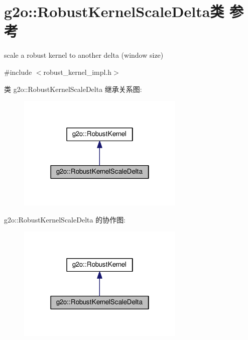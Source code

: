 \hypertarget{classg2o_1_1RobustKernelScaleDelta}{\section{g2o\-:\-:Robust\-Kernel\-Scale\-Delta类 参考}
\label{classg2o_1_1RobustKernelScaleDelta}
}


scale a robust kernel to another delta (window size)  




{\ttfamily \#include $<$robust\-\_\-kernel\-\_\-impl.\-h$>$}



类 g2o\-:\-:Robust\-Kernel\-Scale\-Delta 继承关系图\-:
\nopagebreak
\begin{figure}[H]
\begin{center}
\leavevmode
\includegraphics[width=226pt]{classg2o_1_1RobustKernelScaleDelta__inherit__graph}
\end{center}
\end{figure}


g2o\-:\-:Robust\-Kernel\-Scale\-Delta 的协作图\-:
\nopagebreak
\begin{figure}[H]
\begin{center}
\leavevmode
\includegraphics[width=226pt]{classg2o_1_1RobustKernelScaleDelta__coll__graph}
\end{center}
\end{figure}
